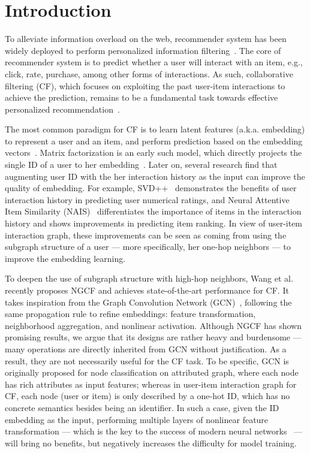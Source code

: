 \documentclass[sigconf]{acmart}
\theoremstyle{definition}
\begin{document}
\section{Introduction}
To alleviate information overload on the web, recommender system has been widely deployed to perform personalized information filtering~\cite{PinSage,YoutubeRS, PeterRec}.
The core of recommender system is to predict whether a user will interact with an item, e.g., click, rate, purchase, among other forms of interactions. As such, collaborative filtering (CF), which focuses on exploiting the past user-item interactions to achieve the prediction, remains to be a fundamental task towards effective personalized recommendation~\cite{NCF,VACF,NGCF,CMN}. 

The most common paradigm for CF is to learn latent features (a.k.a. embedding) to represent a user and an item, and perform prediction based on the embedding vectors~\cite{NCF,DBLP:conf/www/ChengDZK18}.
Matrix factorization is an early such model, which directly projects the single ID of a user to her embedding~\cite{MF}.  Later on, several research find that augmenting user ID with the her interaction history as the input can improve the quality of embedding. For example, SVD++~\cite{SVD++} demonstrates the benefits of user interaction history in predicting user numerical ratings, and Neural Attentive Item Similarity (NAIS)~\cite{NAIS} differentiates the importance of items in the interaction history and shows improvements in predicting item ranking. 
In view of user-item interaction graph, these improvements can be seen as coming from using the subgraph structure of a user --- more specifically, her one-hop neighbors --- to improve the embedding learning. 

To deepen the use of subgraph structure with high-hop neighbors, Wang et al.~\cite{NGCF} recently proposes NGCF and achieves state-of-the-art performance for CF. It takes inspiration from the Graph Convolution Network (GCN)~\cite{GCN,GraphSAGE}, following the same propagation rule to refine embeddings: feature transformation, neighborhood aggregation, and nonlinear activation. Although NGCF has shown promising results, we argue that its designs are rather heavy and burdensome --- many operations are directly inherited from GCN without justification. As a result, they are not necessarily useful for the CF task. To be specific, GCN is originally proposed for node classification on attributed graph, where each node has rich attributes as input features; whereas in user-item interaction graph for CF, each node (user or item) is only described by a one-hot ID, which has no concrete semantics besides being an identifier. In such a case, given the ID embedding as the input, performing multiple layers of nonlinear feature transformation --- which is the key to the success of modern neural networks~\cite{ResNet} --- will bring no benefits, but negatively increases the difficulty for model training. 
\end{document}
